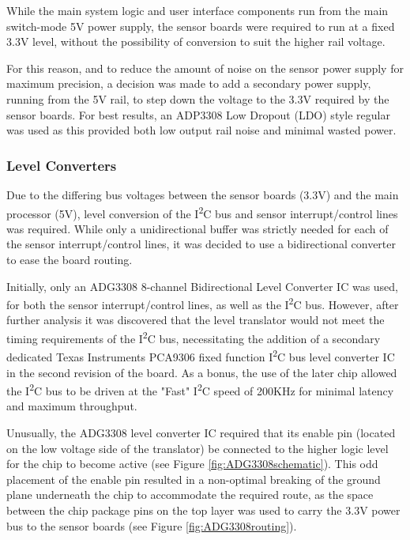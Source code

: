 While the main system logic and user interface components run from the main switch-mode 5V power supply, the sensor boards were required to run at a fixed 3.3V level, without the possibility of conversion to suit the higher rail voltage.

For this reason, and to reduce the amount of noise on the sensor power supply for maximum precision, a decision was made to add a secondary power supply, running from the 5V rail, to step down the voltage to the 3.3V required by the sensor boards. For best results, an ADP3308 Low Dropout (LDO) style regular was used as this provided both low output rail noise and minimal wasted power.

\FloatBarrier
\subsubsection{Level Converters}

Due to the differing bus voltages between the sensor boards (3.3V) and the main processor (5V), level conversion of the I\textsuperscript{2}C bus and sensor interrupt/control lines was required. While only a unidirectional buffer was strictly needed for each of the sensor interrupt/control lines, it was decided to use a bidirectional converter to ease the board routing.

Initially, only an ADG3308 8-channel Bidirectional Level Converter IC was used, for both the sensor interrupt/control lines, as well as the I\textsuperscript{2}C bus. However, after further analysis it was discovered that the level translator would not meet the timing requirements of the I\textsuperscript{2}C bus, necessitating the addition of a secondary dedicated Texas Instruments PCA9306 fixed function I\textsuperscript{2}C bus level converter IC in the second revision of the board. As a bonus, the use of the later chip allowed the I\textsuperscript{2}C bus to be driven at the "Fast" I\textsuperscript{2}C speed of 200KHz for minimal latency and maximum throughput.

Unusually, the ADG3308 level converter IC required that its enable pin (located on the low voltage side of the translator) be connected to the higher logic level for the chip to become active (see Figure \ref{fig:ADG3308schematic}). This odd placement of the enable pin resulted in a non-optimal breaking of the ground plane underneath the chip to accommodate the required route, as the space between the chip package pins on the top layer was used to carry the 3.3V power bus to the sensor boards (see Figure \ref{fig:ADG3308routing}).

